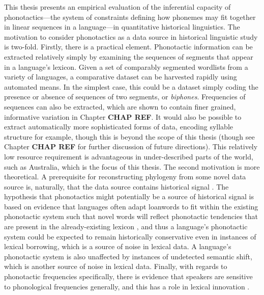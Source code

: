 This thesis presents an empirical evaluation of the inferential capacity of phonotactics---the system of constraints defining how phonemes may fit together in linear sequences in a language---in quantitative historical linguistics. The motivation to consider phonotactics as a data source in historical linguistic study is two-fold. Firstly, there is a practical element. Phonotactic information can be extracted relatively simply by examining the sequences of segments that appear in a language's lexicon. Given a set of comparably segmented wordlists from a variety of languages, a comparative dataset can be harvested rapidly using automated means. In the simplest case, this could be a dataset simply coding the presence or absence of sequences of two segments, or \emph{biphones}. Frequencies of sequences can also be extracted, which are shown to contain finer grained, informative variation in Chapter \textbf{CHAP REF}. It would also be possible to extract automatically more sophisticated forms of data, encoding syllable structure for example, though this is beyond the scope of this thesis (though see Chapter \textbf{CHAP REF} for further discussion of future directions). This relatively low resource requirement is advantageous in under-described parts of the world, such as Australia, which is the focus of this thesis. The second motivation is more theoretical. A prerequisite for reconstructing phylogeny from some novel data source is, naturally, that the data source contains historical signal \autocite{dunn_language_2015}. The hypothesis that phonotactics might potentially be a source of historical signal is based on evidence that languages often adapt loanwords to fit within the existing phonotactic system such that novel words will reflect phonotactic tendencies that are present in the already-existing lexicon \autocites{hyman_role_1970}{silverman_multiple_1992}{crawford_adaptation_2009}{kang_loanword_2011}, and thus a language's phonotactic system could be expected to remain historically conservative even in instances of lexical borrowing, which is a source of noise in lexical data. A language's phonotactic system is also unaffected by instances of undetected semantic shift, which is another source of noise in lexical data. Finally, with regards to phonotactic frequencies specifically, there is evidence that speakers are sensitive to phonological frequencies generally, and this has a role in lexical innovation \autocites{coleman_stochastic_1997}{albright_rules_2003}{hayes_stochastic_2006}[see also][pp.~20--21]{gordon_phonological_2016}.

